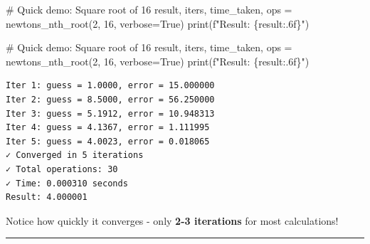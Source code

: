 \documentclass[
  letterpaper,
  DIV=11,
  numbers=noendperiod]{scrartcl}
\newenvironment{Shaded}{\begin{snugshade}}{\end{snugshade}}
\newcommand{\BuiltInTok}[1]{\textcolor[rgb]{0.00,0.23,0.31}{#1}}
\newcommand{\CommentTok}[1]{\textcolor[rgb]{0.37,0.37,0.37}{#1}}
\newcommand{\DecValTok}[1]{\textcolor[rgb]{0.68,0.00,0.00}{#1}}
\newcommand{\NormalTok}[1]{\textcolor[rgb]{0.00,0.23,0.31}{#1}}
\newcommand{\OperatorTok}[1]{\textcolor[rgb]{0.37,0.37,0.37}{#1}}
\newcommand{\SpecialCharTok}[1]{\textcolor[rgb]{0.37,0.37,0.37}{#1}}
\newcommand{\SpecialStringTok}[1]{\textcolor[rgb]{0.13,0.47,0.30}{#1}}
\newcommand{\VariableTok}[1]{\textcolor[rgb]{0.07,0.07,0.07}{#1}}
\begin{document}
\begin{Shaded}
\begin{Highlighting}[]
\CommentTok{\# Quick demo: Square root of 16}
\NormalTok{result, iters, time\_taken, ops }\OperatorTok{=}\NormalTok{ newtons\_nth\_root(}\DecValTok{2}\NormalTok{, }\DecValTok{16}\NormalTok{, verbose}\OperatorTok{=}\VariableTok{True}\NormalTok{)}
\BuiltInTok{print}\NormalTok{(}\SpecialStringTok{f"Result: }\SpecialCharTok{\{}\NormalTok{result}\SpecialCharTok{:.6f\}}\SpecialStringTok{"}\NormalTok{)}
\end{Highlighting}
\end{Shaded}

\begin{Shaded}
\begin{Highlighting}[]
\CommentTok{\# Quick demo: Square root of 16}
\NormalTok{result, iters, time\_taken, ops }\OperatorTok{=}\NormalTok{ newtons\_nth\_root(}\DecValTok{2}\NormalTok{, }\DecValTok{16}\NormalTok{, verbose}\OperatorTok{=}\VariableTok{True}\NormalTok{)}
\BuiltInTok{print}\NormalTok{(}\SpecialStringTok{f"Result: }\SpecialCharTok{\{}\NormalTok{result}\SpecialCharTok{:.6f\}}\SpecialStringTok{"}\NormalTok{)}
\end{Highlighting}
\end{Shaded}

\begin{verbatim}
Iter 1: guess = 1.0000, error = 15.000000
Iter 2: guess = 8.5000, error = 56.250000
Iter 3: guess = 5.1912, error = 10.948313
Iter 4: guess = 4.1367, error = 1.111995
Iter 5: guess = 4.0023, error = 0.018065
✓ Converged in 5 iterations
✓ Total operations: 30
✓ Time: 0.000310 seconds
Result: 4.000001
\end{verbatim}

\begin{tcolorbox}[enhanced jigsaw, title=\textcolor{quarto-callout-tip-color}{\faLightbulb}\hspace{0.5em}{Key Observation}, coltitle=black, titlerule=0mm, breakable, arc=.35mm, leftrule=.75mm, rightrule=.15mm, toptitle=1mm, colback=white, colframe=quarto-callout-tip-color-frame, colbacktitle=quarto-callout-tip-color!10!white, bottomtitle=1mm, opacityback=0, toprule=.15mm, left=2mm, opacitybacktitle=0.6, bottomrule=.15mm]

Notice how quickly it converges - only {\textbf{2-3 iterations}} for
most calculations!

\end{tcolorbox}

\begin{center}\rule{0.5\linewidth}{0.5pt}\end{center}
\end{document}

